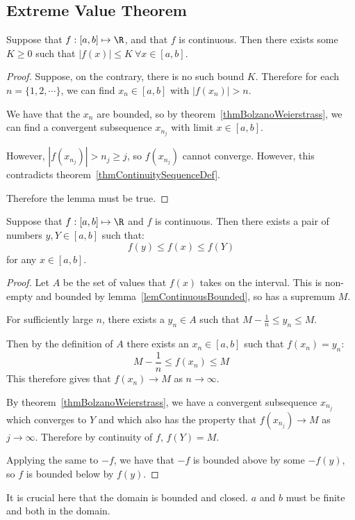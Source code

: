 \documentclass[../Main.tex]{subfiles}
\begin{document}
\subsection{Extreme Value Theorem}
\begin{lemma}
    Suppose that $f : [a, b] \mapsto \R$, and that $f$ is continuous. Then there exists some $K \geq 0$ such that $|f(x)| \leq K~\forall x \in [a, b]$.
    \label{lemContinuousBounded}
\end{lemma}
\begin{proof}
    Suppose, on the contrary, there is no such bound $K$. Therefore for each $n = \{1, 2, \cdots\}$, we can find $x_n \in [a, b]$ with $|f(x_n)| > n$.\par
    We have that the $x_n$ are bounded, so by theorem~\ref{thmBolzanoWeierstrass}, we can find a convergent subsequence $x_{n_j}$ with limit $x \in [a, b]$.\par
    However, $|f(x_{n_j})| > n_j \geq j$, so $f(x_{n_j})$ cannot converge. However, this contradicts theorem~\ref{thmContinuitySequenceDef}.\contradiction\par
    Therefore the lemma must be true.
\end{proof}
\begin{theorem}
    Suppose that $f : [a, b] \mapsto \R$ and $f$ is continuous. Then there exists a pair of numbers $y, Y \in [a, b]$ such that:
    \begin{equation*}
        f(y) \leq f(x) \leq f(Y)
    \end{equation*}
    for any $x \in [a, b]$.
    \label{thmExtremeValue}
\end{theorem}
\begin{proof}
    Let $A$ be the set of values that $f(x)$ takes on the interval. This is non-empty and bounded by lemma~\ref{lemContinuousBounded}, so has a supremum $M$.\par
    For sufficiently large $n$, there exists a $y_n \in A$ such that $M - \frac{1}{n} \leq y_n \leq M$.\par
    Then by the definition of $A$ there exists an $x_n \in [a, b]$ such that $f(x_n) = y_n$:
    \begin{equation*}
        M - \frac{1}{n} \leq f(x_n) \leq M
    \end{equation*}
    This therefore gives that $f(x_n) \to M$ as $n \to \infty$.\par
    By theorem~\ref{thmBolzanoWeierstrass}, we have a convergent subsequence $x_{n_j}$ which converges to $Y$ and which also has the property that $f(x_{n_j}) \to M$ as $j \to \infty$. Therefore by continuity of $f$, $f(Y) = M$.\par
    Applying the same to $-f$, we have that $-f$ is bounded above by some $-f(y)$, so $f$ is bounded below by $f(y)$.
\end{proof}
\begin{remark}
    It is crucial here that the domain is bounded and closed. $a$ and $b$ must be finite and both in the domain.
\end{remark}
\end{document}
